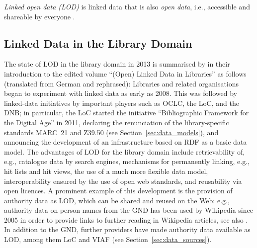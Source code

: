 \par\medskip
\emph{Linked open data (LOD)} is linked data that is also \emph{open data},
i.e., accessible and shareable by everyone \autocite{WikiLinkedData}.




\subsection{Linked Data in the Library Domain}

The state of LOD in the library domain in 2013 is summarised by \textcite{Pohl2013}
in their introduction to the edited volume \enquote{(Open) Linked Data in Libraries} \autocite{Danowski2013}
as follows (translated from German and rephrased): Libraries and related organisations
began to experiment with linked data as early as 2008.
This was followed by linked-data initiatives by important players such as
OCLC, the \gls{LoC}, and the \gls{DNB};
in particular, the \gls{LoC} started the initiative \enquote{Bibliographic Framework for the Digital Age} in 2011,
%
%
declaring the renunciation of the library-specific standards \gls{MARC}~21 and \gls{Z39.50} (see Section~\ref{sec:data_models}),
and announcing the development of an infrastructure based on \gls{RDF} as a basic data model. The advantages of LOD for the library domain include
retrievability of, e.g., catalogue data by search engines,
mechanisms for permanently linking, e.g., hit lists and hit views,
the use of a much more flexible data model,
interoperability ensured by the use of open web standards,
and reusability via open licences.
A prominent example of this development is the provision of authority data as LOD,
which can be shared and reused on the Web:
e.g., authority data on person names from the \gls{GND} has been used by Wikipedia since 2005
in order to provide links to further reading in Wikipedia articles, see also \autocite{Hengel2005}.
In addition to the \gls{GND}, further providers have made authority data available as LOD,
among them \gls{LoC} and \gls{VIAF} (see Section~\ref{sec:data_sources}).

